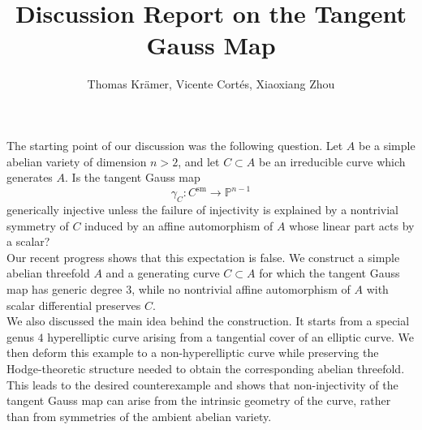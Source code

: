 \documentclass[11pt]{article}
\title{Discussion Report on the Tangent Gauss Map}
\author{Thomas Krämer, Vicente Cortés, Xiaoxiang Zhou}
\date{}
\begin{document}
\maketitle

The starting point of our discussion was the following question. Let $A$ be a simple abelian variety of dimension $n>2$, and let $C\subset A$ be an irreducible curve which generates $A$. Is the tangent Gauss map
\[
\gamma_C\colon C^{\mathrm{sm}}\longrightarrow \mathbb{P}^{n-1}
\]
generically injective unless the failure of injectivity is explained by a nontrivial symmetry of $C$ induced by an affine automorphism of $A$ whose linear part acts by a scalar?
\\

Our recent progress shows that this expectation is false. We construct a simple abelian threefold $A$ and a generating curve $C\subset A$ for which the tangent Gauss map has generic degree $3$, while no nontrivial affine automorphism of $A$ with scalar differential preserves $C$.
\\

We also discussed the main idea behind the construction. It starts from a special genus $4$ hyperelliptic curve arising from a tangential cover of an elliptic curve. We then deform this example to a non-hyperelliptic curve while preserving the Hodge-theoretic structure needed to obtain the corresponding abelian threefold. This leads to the desired counterexample and shows that non-injectivity of the tangent Gauss map can arise from the intrinsic geometry of the curve, rather than from symmetries of the ambient abelian variety.
\end{document}
